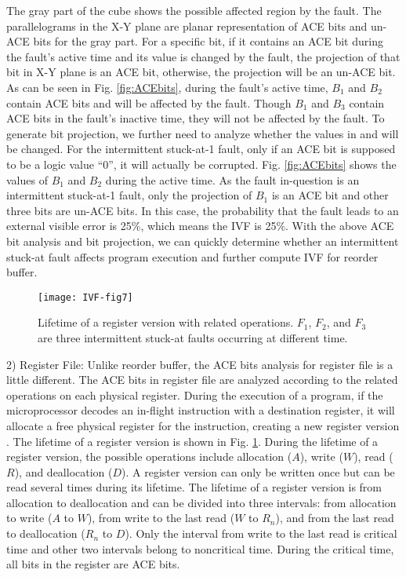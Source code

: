 The gray part of the cube shows the possible affected region by the fault. The parallelograms in the X-Y plane are planar representation of ACE bits and un-ACE bits for the gray part. For a specific bit, if it contains an ACE bit during the fault’s active time and its value is changed by the fault, the projection of that bit in X-Y plane is an ACE bit, otherwise, the projection will be an un-ACE bit. As can be seen in Fig. \ref{fig:ACEbits}, during the fault’s active time, $B_1$ and $B_2$ contain ACE bits and will be affected by the fault. Though $B_1$ and $B_3$ contain ACE bits in the fault’s inactive time, they will not be affected by the fault. To generate bit projection, we further need to analyze whether the values in and will be changed. For the intermittent stuck-at-1 fault, only if an ACE bit is supposed to be a logic value “0”, it will actually be corrupted. Fig. \ref{fig:ACEbits} shows the values of $B_1$ and $B_2$ during the active time. As the fault in-question is an intermittent stuck-at-1 fault, only the projection of $B_1$ is an ACE bit and other three bits are un-ACE bits. In this case, the probability that the fault leads to an external visible error is 25\%, which means the IVF is 25\%. With the above ACE bit analysis and bit projection, we can quickly determine whether an intermittent stuck-at fault affects program execution and further compute IVF for reorder buffer.

\begin{figure}[t]
    \centering
    \texttt{[image: IVF-fig7]}\\
    \caption{Lifetime of a register version with related operations. $F_1$, $F_2$, and $F_3$ are three intermittent stuck-at faults occurring at different time.}
    \label{fig:register-lifetime}
\end{figure}


2) Register File: Unlike reorder buffer, the ACE bits analysis for register file is a little different. The ACE bits in register file are analyzed according to the related operations on each physical register. During the execution of a program, if the microprocessor decodes an in-flight instruction with a destination register, it will allocate a free physical register for the instruction, creating a new register version \cite{montesinos2007using}. The lifetime of a register version is shown in Fig. \ref{fig:register-lifetime}. During the lifetime of a register version, the possible operations include allocation ($A$), write ($W$), read ($R$), and deallocation ($D$). A register version can only be written once but can be read several times during its lifetime. The lifetime of a register version is from allocation to deallocation and can be divided into three intervals: from allocation to write ($A$ to $W$), from write to the last read ($W$ to $R_n$), and from the last read to deallocation ($R_n$ to $D$). Only the interval from write to the last read is critical time and other two intervals belong to noncritical time. During the critical time, all bits in the register are ACE bits.

